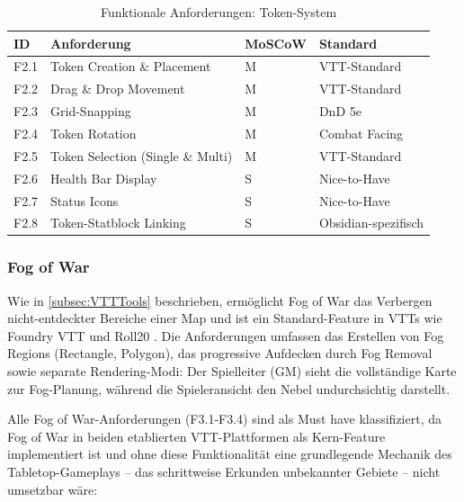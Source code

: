 \begin{table}[htbp]
	\centering
	\small
	\caption{Funktionale Anforderungen: Token-System}
	\label{tab:funktionale-anforderungen-token}
	\begin{tabularx}{\textwidth}{llXl}
		\toprule
		\textbf{ID} & \textbf{Anforderung}              & \textbf{MoSCoW} & \textbf{Standard}   \\
		\midrule
		F2.1        & Token Creation \& Placement       & M               & \ac{VTT}-Standard   \\
		F2.2        & Drag \& Drop Movement             & M               & \ac{VTT}-Standard   \\
		F2.3        & Grid-Snapping                     & M               & \ac{DnD} 5e         \\
		F2.4        & Token Rotation                    & M               & Combat Facing       \\
		F2.5        & Token Selection (Single \& Multi) & M               & \ac{VTT}-Standard   \\
		F2.6        & Health Bar Display                & S               & Nice-to-Have        \\
		F2.7        & Status Icons                      & S               & Nice-to-Have        \\
		F2.8        & Token-Statblock Linking           & S               & Obsidian-spezifisch \\
		\bottomrule
	\end{tabularx}
\end{table}

\subsubsection{Fog of War}

Wie in \autoref{subsec:VTTTools} beschrieben, ermöglicht Fog of War das Verbergen nicht-entdeckter Bereiche einer Map und ist ein Standard-Feature in VTTs wie Foundry \ac{VTT} und Roll20 \autocite{FoundryScenes2024,Roll20FogOfWar2024}. Die Anforderungen umfassen das Erstellen von Fog Regions (Rectangle, Polygon), das progressive Aufdecken durch Fog Removal sowie separate Rendering-Modi: Der Spielleiter (\ac{GM}) sieht die vollständige Karte zur Fog-Planung, während die Spieleransicht den Nebel undurchsichtig darstellt.

Alle Fog of War-Anforderungen (F3.1-F3.4) sind als Must have klassifiziert, da Fog of War in beiden etablierten \ac{VTT}-Plattformen als Kern-Feature implementiert ist und ohne diese Funktionalität eine grundlegende Mechanik des Tabletop-Gameplays -- das schrittweise Erkunden unbekannter Gebiete -- nicht umsetzbar wäre:

